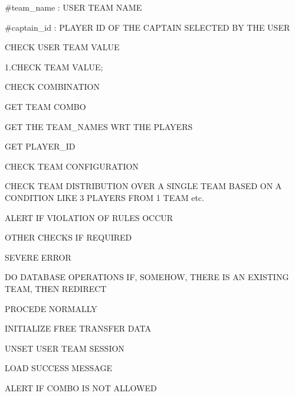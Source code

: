 \#team\+\_\+name \+: U\+S\+E\+R T\+E\+A\+M N\+A\+M\+E

\#captain\+\_\+id \+: P\+L\+A\+Y\+E\+R I\+D O\+F T\+H\+E C\+A\+P\+T\+A\+I\+N S\+E\+L\+E\+C\+T\+E\+D B\+Y T\+H\+E U\+S\+E\+R

C\+H\+E\+C\+K U\+S\+E\+R T\+E\+A\+M V\+A\+L\+U\+E

1.\+C\+H\+E\+C\+K T\+E\+A\+M V\+A\+L\+U\+E;


\begin{DoxyEnumerate}
\item C\+H\+E\+C\+K C\+O\+M\+B\+I\+N\+A\+T\+I\+O\+N
\end{DoxyEnumerate}

G\+E\+T T\+E\+A\+M C\+O\+M\+B\+O

G\+E\+T T\+H\+E T\+E\+A\+M\+\_\+\+N\+A\+M\+E\+S W\+R\+T T\+H\+E P\+L\+A\+Y\+E\+R\+S

G\+E\+T P\+L\+A\+Y\+E\+R\+\_\+\+I\+D

C\+H\+E\+C\+K T\+E\+A\+M C\+O\+N\+F\+I\+G\+U\+R\+A\+T\+I\+O\+N


\begin{DoxyEnumerate}
\item C\+H\+E\+C\+K T\+E\+A\+M D\+I\+S\+T\+R\+I\+B\+U\+T\+I\+O\+N O\+V\+E\+R A S\+I\+N\+G\+L\+E T\+E\+A\+M B\+A\+S\+E\+D O\+N A C\+O\+N\+D\+I\+T\+I\+O\+N L\+I\+K\+E 3 P\+L\+A\+Y\+E\+R\+S F\+R\+O\+M 1 T\+E\+A\+M etc.
\end{DoxyEnumerate}

A\+L\+E\+R\+T I\+F V\+I\+O\+L\+A\+T\+I\+O\+N O\+F R\+U\+L\+E\+S O\+C\+C\+U\+R

O\+T\+H\+E\+R C\+H\+E\+C\+K\+S I\+F R\+E\+Q\+U\+I\+R\+E\+D

S\+E\+V\+E\+R\+E E\+R\+R\+O\+R

D\+O D\+A\+T\+A\+B\+A\+S\+E O\+P\+E\+R\+A\+T\+I\+O\+N\+S I\+F, S\+O\+M\+E\+H\+O\+W, T\+H\+E\+R\+E I\+S A\+N E\+X\+I\+S\+T\+I\+N\+G T\+E\+A\+M, T\+H\+E\+N R\+E\+D\+I\+R\+E\+C\+T

P\+R\+O\+C\+E\+D\+E N\+O\+R\+M\+A\+L\+L\+Y

I\+N\+I\+T\+I\+A\+L\+I\+Z\+E F\+R\+E\+E T\+R\+A\+N\+S\+F\+E\+R D\+A\+T\+A

U\+N\+S\+E\+T U\+S\+E\+R T\+E\+A\+M S\+E\+S\+S\+I\+O\+N

L\+O\+A\+D S\+U\+C\+C\+E\+S\+S M\+E\+S\+S\+A\+G\+E

A\+L\+E\+R\+T I\+F C\+O\+M\+B\+O I\+S N\+O\+T A\+L\+L\+O\+W\+E\+D \hypertarget{class_user_a0e374aca34aaa9dedb6b141cb4289d9d}{}

